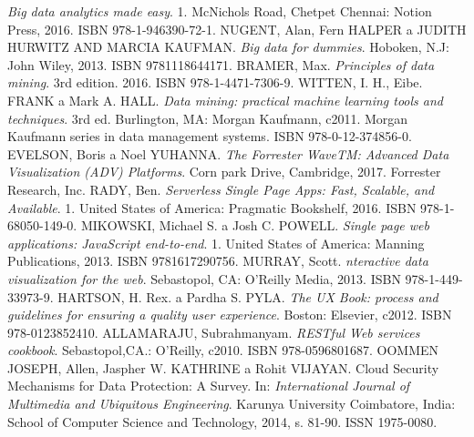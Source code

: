 \begin{thebibliography}{99}
\textit{Big data analytics made easy}.
1. McNichols Road, Chetpet Chennai: Notion Press, 2016. ISBN 978-1-946390-72-1.
NUGENT, Alan, Fern HALPER a JUDITH HURWITZ AND MARCIA KAUFMAN.
\textit{Big data for dummies}.
Hoboken, N.J: John Wiley, 2013. ISBN 9781118644171.
BRAMER, Max.
\textit{Principles of data mining}.
3rd edition. 2016. ISBN 978-1-4471-7306-9.
WITTEN, I. H., Eibe. FRANK a Mark A. HALL.
\textit{Data mining: practical machine learning tools and techniques}.
3rd ed. Burlington, MA: Morgan Kaufmann, c2011. Morgan Kaufmann series in data management systems. ISBN 978-0-12-374856-0.
EVELSON, Boris a Noel YUHANNA.
\textit{The Forrester WaveTM: Advanced Data Visualization (ADV) Platforms}.
Corn park Drive, Cambridge, 2017. Forrester Research, Inc.
RADY, Ben.
\textit{Serverless Single Page Apps: Fast, Scalable, and Available}.
1. United States of America: Pragmatic Bookshelf, 2016. ISBN 978-1-68050-149-0.
MIKOWSKI, Michael S. a Josh C. POWELL.
\textit{Single page web applications: JavaScript end-to-end}.
1. United States of America: Manning Publications, 2013. ISBN 9781617290756.
MURRAY, Scott.
\textit{nteractive data visualization for the web}.
Sebastopol, CA: O'Reilly Media, 2013. ISBN 978-1-449-33973-9.
HARTSON, H. Rex. a Pardha S. PYLA.
\textit{The UX Book: process and guidelines for ensuring a quality user experience}.
Boston: Elsevier, c2012. ISBN 978-0123852410.
ALLAMARAJU, Subrahmanyam.
\textit{RESTful Web services cookbook}.
Sebastopol,CA.: O'Reilly, c2010. ISBN 978-0596801687.
OOMMEN JOSEPH, Allen, Jaspher W. KATHRINE a Rohit VIJAYAN.
Cloud Security Mechanisms for Data Protection: A Survey. In: \textit{International Journal of Multimedia and Ubiquitous Engineering}.
Karunya University Coimbatore, India: School of Computer Science and Technology, 2014, s. 81-90. ISSN 1975-0080.


\end{thebibliography}
